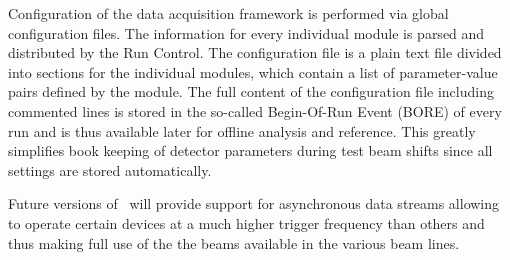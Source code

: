 Configuration of the data acquisition framework is performed via global configuration files. 
The information for every individual module is parsed and distributed by the Run Control. 
The configuration file is a plain text file divided into sections for the individual modules, which contain a list of parameter-value pairs defined by the module.
The full content of the configuration file including commented lines is stored in the so-called Begin-Of-Run Event (BORE) of every run and is thus available later for offline analysis and reference. 
This greatly simplifies book keeping of detector parameters during test beam shifts since all settings are stored automatically.


Future versions of \eudaq\ will provide support for asynchronous data streams allowing to operate certain devices at a much higher trigger frequency than others and thus making full use of the the beams available in the various beam lines.

